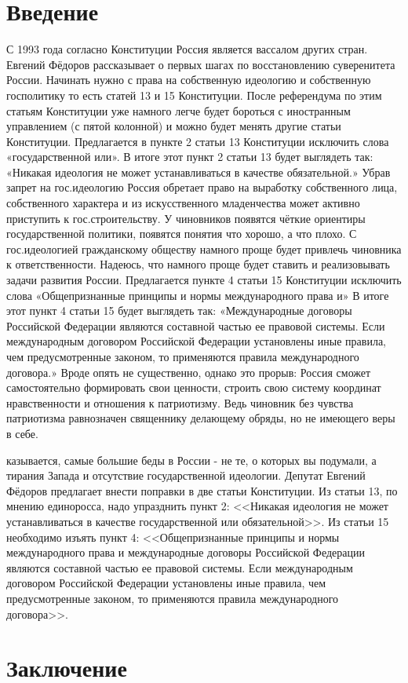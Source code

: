 \documentclass[a4paper,12pt]{diss_4}
\begin{document}

\addtocounter{page}{1}

\tableofcontents

\chapter*{Введение}

С 1993 года согласно Конституции Россия является вассалом других стран. Евгений Фёдоров рассказывает о первых шагах по восстановлению суверенитета России. Начинать нужно с права на собственную идеологию и собственную госполитику то есть статей 13 и 15 Конституции. После референдума по этим статьям Конституции уже намного легче будет бороться с иностранным управлением (с пятой колонной) и можно будет менять другие статьи Конституции.
Предлагается в пункте 2 статьи 13 Конституции исключить слова «государственной или».
В итоге этот пункт 2 статьи 13 будет выглядеть так: «Никакая идеология не может устанавливаться в качестве обязательной.» 
Убрав запрет на гос.идеологию Россия обретает право на выработку собственного лица, собственного характера и из искусственного младенчества может активно приступить к гос.строительству. У чиновников появятся чёткие ориентиры государственной политики, появятся понятия что хорошо, а что плохо. С гос.идеологией гражданскому обществу намного проще будет привлечь чиновника к ответственности. Надеюсь, что намного проще будет ставить и реализовывать задачи развития России.
Предлагается пункте 4 статьи 15 Конституции исключить слова «Общепризнанные принципы и нормы международного права и»
В итоге этот пункт 4 статьи 15 будет выглядеть так: «Международные договоры Российской Федерации являются составной частью ее правовой системы. Если международным договором Российской Федерации установлены иные правила, чем предусмотренные законом, то применяются правила международного договора.» 
Вроде опять не существенно, однако это прорыв: Россия сможет самостоятельно формировать свои ценности, строить свою систему координат нравственности и отношения к патриотизму. Ведь чиновник без чувства патриотизма равнозначен священнику делающему обряды, но не имеющего веры в себе.


казывается, самые большие беды в России - не те, о которых вы подумали, а тирания Запада и отсутствие государственной идеологии. Депутат Евгений Фёдоров предлагает внести поправки в две статьи Конституции. Из статьи 13, по мнению единоросса, надо упразднить пункт 2: <<Никакая идеология не может устанавливаться в качестве государственной или обязательной>>. Из статьи 15 необходимо изъять пункт 4: <<Общепризнанные принципы и нормы международного права и международные договоры Российской Федерации являются составной частью ее правовой системы. Если международным договором Российской Федерации установлены иные правила, чем предусмотренные законом, то применяются правила международного договора>>.

\chapter*{Заключение}


\begin{thebibliography}{99}



\end{thebibliography}
\end{document}
